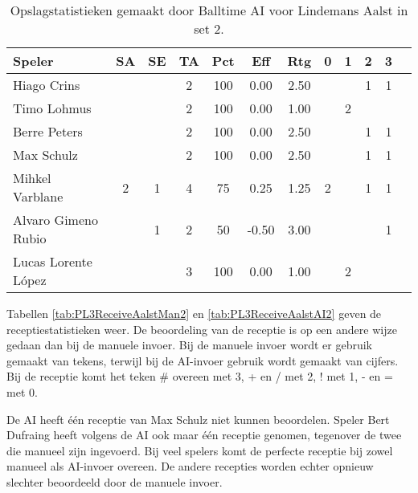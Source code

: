 \begin{table}[ht!]
  \centering
  \scriptsize
  \begin{tabular}{|l|c|c|c|c|c|c|c|c|c|c|c|} \hline
    \textbf{Speler} & SA & SE & TA & Pct & Eff & Rtg & 0 & 1 & 2 & 3  \\ \hline
    Hiago Crins &  &  & 2 & 100 & 0.00 & 2.50 &   &  & 1 & 1  \\
    Timo Lohmus &  &  & 2 & 100 & 0.00 & 1.00 &   & 2 &   &  \\
    Berre Peters &  &  & 2 & 100 & 0.00 & 2.50 &   &  & 1 & 1 \\
    Max Schulz &  &  & 2 & 100 & 0.00 & 2.50 &   &  & 1 & 1 \\
    Mihkel Varblane & 2 & 1 & 4 & 75 & 0.25 & 1.25 & 2 &   & 1 & 1 \\
    Alvaro Gimeno Rubio & & 1 & 2 & 50 & -0.50 & 3.00 &   &  & & 1 \\ 
    Lucas Lorente López &  &  & 3 & 100 & 0.00 & 1.00 &   & 2 &   & \\  \hline
  \end{tabular}
  \caption[Opslagstatistieken gemaakt door Balltime AI voor Lindemans Aalst in set 2]{\label{tab:PL3ServeAalstAI2}Opslagstatistieken gemaakt door Balltime AI voor Lindemans Aalst in set 2.}
\end{table}

Tabellen \ref{tab:PL3ReceiveAalstMan2} en \ref{tab:PL3ReceiveAalstAI2} geven de receptiestatistieken weer. De beoordeling van de receptie is op een andere wijze gedaan dan bij de manuele invoer. Bij de manuele invoer wordt er gebruik gemaakt van tekens, terwijl bij de AI-invoer gebruik wordt gemaakt van cijfers. Bij de receptie komt het teken \# overeen met 3, + en / met 2, ! met 1, - en = met 0.

De AI heeft één receptie van Max Schulz niet kunnen beoordelen. Speler Bert Dufraing heeft volgens de AI ook maar één receptie genomen, tegenover de twee die manueel zijn ingevoerd. Bij veel spelers komt de perfecte receptie bij zowel manueel als AI-invoer overeen. De andere recepties worden echter opnieuw slechter beoordeeld door de manuele invoer.

